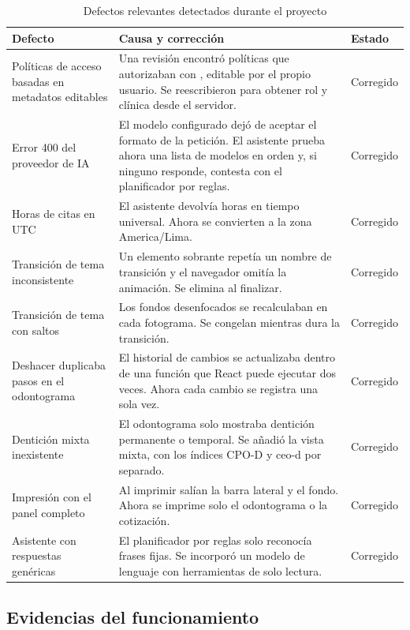 \documentclass[11pt]{article}
\begin{document}
\begin{table}[H]
\centering\small
\caption{Defectos relevantes detectados durante el proyecto}\label{tab:defectos}
\begin{tabularx}{\linewidth}{@{}P{3.5cm}LP{1.9cm}@{}}
\toprule
\textbf{Defecto} & \textbf{Causa y corrección} & \textbf{Estado} \\
\midrule
Políticas de acceso basadas en metadatos editables & Una revisión encontró políticas que autorizaban con , editable por el propio usuario. Se reescribieron para obtener rol y clínica desde el servidor. & Corregido \\
Error 400 del proveedor de IA & El modelo configurado dejó de aceptar el formato de la petición. El asistente prueba ahora una lista de modelos en orden y, si ninguno responde, contesta con el planificador por reglas. & Corregido \\
Horas de citas en UTC & El asistente devolvía horas en tiempo universal. Ahora se convierten a la zona America/Lima. & Corregido \\
Transición de tema inconsistente & Un elemento sobrante repetía un nombre de transición y el navegador omitía la animación. Se elimina al finalizar. & Corregido \\
Transición de tema con saltos & Los fondos desenfocados se recalculaban en cada fotograma. Se congelan mientras dura la transición. & Corregido \\
Deshacer duplicaba pasos en el odontograma & El historial de cambios se actualizaba dentro de una función que React puede ejecutar dos veces. Ahora cada cambio se registra una sola vez. & Corregido \\
Dentición mixta inexistente & El odontograma solo mostraba dentición permanente o temporal. Se añadió la vista mixta, con los índices CPO-D y ceo-d por separado. & Corregido \\
Impresión con el panel completo & Al imprimir salían la barra lateral y el fondo. Ahora se imprime solo el odontograma o la cotización. & Corregido \\
Asistente con respuestas genéricas & El planificador por reglas solo reconocía frases fijas. Se incorporó un modelo de lenguaje con herramientas de solo lectura. & Corregido \\
\bottomrule
\end{tabularx}
\end{table}

\subsection{Evidencias del funcionamiento}
\end{document}
